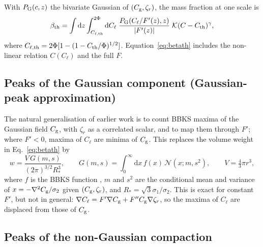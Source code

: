 \documentclass{article}
\newcommand{\Cg}{C_{\rm g}}
\newcommand{\Cl}{C_{\ell}}
\newcommand{\zr}{\zeta_r}
\newcommand{\dd}{\mathrm{d}}
\begin{document}
With $P_{\rm G}(c,z)$ the bivariate Gaussian of $(\Cg,\zr)$, the mass fraction at one scale is
\cite{Ferrante}
\begin{equation}
\beta_{\rm th}=\int\dd z\int_{C_{\ell,\rm th}}^{2\Phi}\dd\Cl\;\frac{P_{\rm G}(\Cl/F'(z),z)}{|F'(z)|}\;
\mathcal K(C-C_{\rm th})^\gamma ,
\label{eq:betath}
\end{equation}
where $C_{\ell,\rm th}=2\Phi[1-(1-C_{\rm th}/\Phi)^{1/2}]$. Equation~\eqref{eq:betath} includes the
non-linear relation $C(\Cl)$ and the full $F$.

\subsection{Peaks of the Gaussian component (Gaussian-peak approximation)}

The natural generalisation of earlier work is to count BBKS maxima of the Gaussian field $\Cg$,
with $\zr$ as a correlated scalar, and to map them through $F'$; where $F'<0$, maxima of $\Cl$ are
minima of $\Cg$. This replaces the volume weight in Eq.~\eqref{eq:betath} by
\begin{equation}
w=\frac{V\,G(m,s)}{(2\pi)^{3/2}R_*^3},\qquad G(m,s)=\int_0^\infty\dd x\,f(x)\,\mathcal N(x;m,s^2),
\qquad V=\tfrac43\pi r^3,
\label{eq:3a}
\end{equation}
where $f$ is the BBKS function \cite{BBKS}, $m$ and $s^2$ are the conditional mean and variance
of $x=-\nabla^2\Cg/\sigma_{2}$ given $(\Cg,\zr)$, and $R_*=\sqrt3\sigma_1/\sigma_2$. This is exact
for constant $F'$, but not in general: $\nabla\Cl=F'\nabla\Cg+F''\Cg\nabla\zr$, so the maxima of
$\Cl$ are displaced from those of $\Cg$.

\subsection{Peaks of the non-Gaussian compaction}
\end{document}
